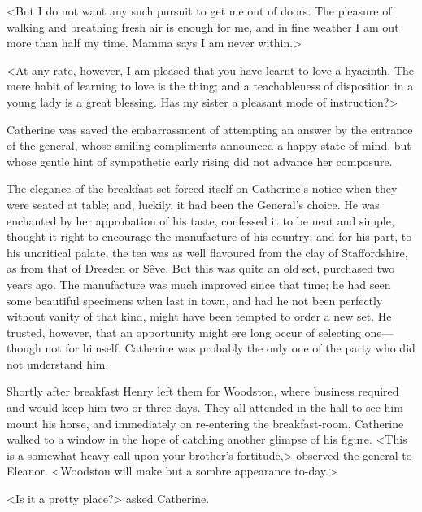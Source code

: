  <But I do not want any such pursuit to get me out of doors. The pleasure of walking and breathing fresh air is enough for me, and in fine weather I am out more than half my time. Mamma says I am never within.> 

 <At any rate, however, I am pleased that you have learnt to love a hyacinth. The mere habit of learning to love is the thing; and a teachableness of disposition in a young lady is a great blessing. Has my sister a pleasant mode of instruction?> 

 Catherine was saved the embarrassment of attempting an answer by the entrance of the general, whose smiling compliments announced a happy state of mind, but whose gentle hint of sympathetic early rising did not advance her composure. 

 The elegance of the breakfast set forced itself on Catherine's notice when they were seated at table; and, luckily, it had been the General's choice. He was enchanted by her approbation of his taste, confessed it to be neat and simple, thought it right to encourage the manufacture of his country; and for his part, to his uncritical palate, the tea was as well flavoured from the clay of Staffordshire, as from that of Dresden or Sêve. But this was quite an old set, purchased two years ago. The manufacture was much improved since that time; he had seen some beautiful specimens when last in town, and had he not been perfectly without vanity of that kind, might have been tempted to order a new set. He trusted, however, that an opportunity might ere long occur of selecting one—though not for himself. Catherine was probably the only one of the party who did not understand him. 

 Shortly after breakfast Henry left them for Woodston, where business required and would keep him two or three days. They all attended in the hall to see him mount his horse, and immediately on re-entering the breakfast-room, Catherine walked to a window in the hope of catching another glimpse of his figure. <This is a somewhat heavy call upon your brother's fortitude,> observed the general to Eleanor. <Woodston will make but a sombre appearance to-day.> 

 <Is it a pretty place?> asked Catherine. 

